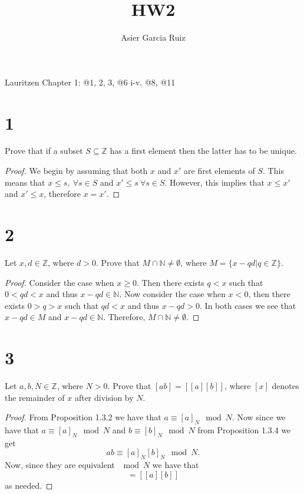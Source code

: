 \documentclass{article}
\title{HW2}
\author{Asier Garcia Ruiz}
\newcommand{\N}{\mathbb{N}}
\newcommand{\Z}{\mathbb{Z}}
\begin{document}
\maketitle

Lauritzen Chapter 1: @1, 2, 3, @6 i-v, @8, @11
\section*{1}
Prove that if a subset $S \subseteq \Z$ has a first element then the latter has
to be unique.

\begin{proof}
    We begin by assuming that both $x$ and $x'$ are first elements of $S$.
    This means that $x \leq s, \ \forall s \in S$ and $x' \leq s \ \forall s \in S$.
    However, this implies that $x \leq x'$ and $x' \leq x$, therefore $x = x'$.
\end{proof}

\section*{2}
Let $x, d \in \Z$, where $d > 0$. Prove that $M \cap \N \neq \emptyset$, where
$M = \{x-qd | q \in \Z\}$.

\begin{proof}
    Consider the case when $x \geq 0$. Then there exists $q < x$ such that $0 < qd < x$
    and thus $x-qd \in \N$. Now consider the case when $x < 0$, then there exists
    $0 > q > x$ such that $qd < x$ and thus $x - qd > 0$. In both cases we see that
    $x -qd \in M$ and $x-qd\in\N$. Therefore, $M\cap \N \neq \emptyset$.
\end{proof}

\section*{3}
Let $a,b,N \in \Z$, where $N>0$. Prove that $[ab] = [[a][b]]$, where $[x]$ denotes
the remainder of $x$ after division by $N$.

\begin{proof}
    From Proposition 1.3.2 we have that $a \equiv [a]_N \mod N$. Now since
    we have that $a \equiv [a]_N \mod N$ and $b \equiv [b]_N \mod N$ from
    Proposition 1.3.4 we get
    \begin{equation*}
        ab \equiv [a]_N[b]_N \mod N.
    \end{equation*}
    Now, since they are equivalent $\mod N$ we have that
    \begin{equation*}
        [ab] = [[a][b]]
    \end{equation*}
    as needed.
\end{proof}
\end{document}
